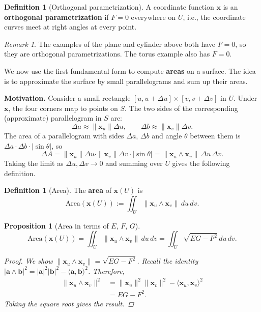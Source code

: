 \documentclass[10pt, a4paper]{article}
\theoremstyle{plain}
\newtheorem{proposition}[theorem]{Proposition}
\theoremstyle{definition}
\newtheorem{definition}[theorem]{Definition}
\theoremstyle{remark}
\newtheorem{remark}[theorem]{Remark}
\begin{document}
\begin{definition}[Orthogonal parametrization]
  A coordinate function $\mathbf{x}$ is an \textbf{orthogonal parametrization} if
  $F = 0$ everywhere on $U$, i.e., the coordinate curves meet at right angles at
  every point.
\end{definition}

\begin{remark}
  The examples of the plane and cylinder above both have $F = 0$, so they are
  orthogonal parametrizations. The torus example also has $F = 0$.
\end{remark}



We now use the first fundamental form to compute \textbf{areas} on a surface.
The idea is to approximate the surface by small parallelograms and sum up
their areas.

\medskip \noindent \textbf{Motivation.} Consider a small rectangle $[u, u+\Delta u]
\times [v, v+\Delta v]$ in $U$. Under $\mathbf{x}$, the four corners map to points
on $S$. The two sides of the corresponding (approximate) parallelogram in $S$ are:
\[
  \Delta a \approx \|\mathbf{x}_u\|\Delta u, \qquad
  \Delta b \approx \|\mathbf{x}_v\|\Delta v.
\]
The area of a parallelogram with sides $\Delta a$, $\Delta b$ and angle $\theta$
between them is $\Delta a \cdot \Delta b \cdot |\sin\theta|$, so
\[
  \Delta A
  = \|\mathbf{x}_u\|\Delta u \cdot \|\mathbf{x}_v\|\Delta v \cdot |\sin\theta|
  = \|\mathbf{x}_u \wedge \mathbf{x}_v\|\, \Delta u\, \Delta v.
\]
Taking the limit as $\Delta u, \Delta v \to 0$ and summing over $U$ gives the
following definition.

\begin{definition}[Area]
  The \textbf{area} of $\mathbf{x}(U)$ is
  \[
    \mathrm{Area}(\mathbf{x}(U))
    := \iint_U \|\mathbf{x}_u \wedge \mathbf{x}_v\|\, du\, dv.
  \]
\end{definition}

\begin{proposition}[Area in terms of $E$, $F$, $G$]
  \[
    \mathrm{Area}(\mathbf{x}(U))
    = \iint_U \|\mathbf{x}_u \wedge \mathbf{x}_v\|\, du\, dv
    = \iint_U \sqrt{EG - F^2}\, du\, dv.
  \]

  \begin{proof}
    We show $\|\mathbf{x}_u \wedge \mathbf{x}_v\| = \sqrt{EG - F^2}$. Recall the
    identity $|\mathbf{a} \wedge \mathbf{b}|^2 = |\mathbf{a}|^2|\mathbf{b}|^2
    - \langle \mathbf{a}, \mathbf{b}\rangle^2$. Therefore,
    \begin{align*}
      \|\mathbf{x}_u \wedge \mathbf{x}_v\|^2
      &= \|\mathbf{x}_u\|^2\|\mathbf{x}_v\|^2 - \langle \mathbf{x}_u, \mathbf{x}_v\rangle^2 \\
      &= EG - F^2.
    \end{align*}
    Taking the square root gives the result.
  \end{proof}
\end{proposition}
\end{document}

